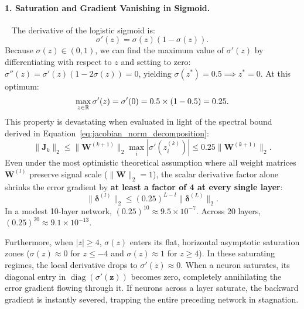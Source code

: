 \paragraph{1. Saturation and Gradient Vanishing in Sigmoid.}~\cite{glorot2010understanding}
The derivative of the logistic sigmoid is:
\begin{equation}
\sigma'(z) = \sigma(z)(1 - \sigma(z)).
\label{eq:sigmoid_derivative}
\end{equation}
Because $\sigma(z) \in (0, 1)$, we can find the maximum value of $\sigma'(z)$ by differentiating with respect to $z$ and setting to zero: $\sigma''(z) = \sigma'(z)(1 - 2\sigma(z)) = 0$, yielding $\sigma(z^*) = 0.5 \implies z^* = 0$. At this optimum:
\begin{equation}
\max_{z \in \mathbb{R}} \sigma'(z) = \sigma'(0) = 0.5 \times (1 - 0.5) = 0.25.
\label{eq:sigmoid_max_deriv}
\end{equation}
This property is devastating when evaluated in light of the spectral bound derived in Equation~\eqref{eq:jacobian_norm_decomposition}:
\begin{equation}
\|\mathbf{J}_k\|_2 \le \|\mathbf{W}^{(k+1)}\|_2 \max_i |\sigma'(z_i^{(k)})| \le 0.25 \|\mathbf{W}^{(k+1)}\|_2.
\end{equation}
Even under the most optimistic theoretical assumption where all weight matrices $\mathbf{W}^{(l)}$ preserve signal scale ($\|\mathbf{W}\|_2 = 1$), the scalar derivative factor alone shrinks the error gradient by \textbf{at least a factor of 4 at every single layer}:
\begin{equation}
\|\boldsymbol{\delta}^{(l)}\|_2 \le (0.25)^{L-l} \|\boldsymbol{\delta}^{(L)}\|_2.
\end{equation}
In a modest 10-layer network, $(0.25)^{10} \approx 9.5 \times 10^{-7}$. Across 20 layers, $(0.25)^{20} \approx 9.1 \times 10^{-13}$.

Furthermore, when $|z| \ge 4$, $\sigma(z)$ enters its flat, horizontal asymptotic saturation zones ($\sigma(z) \approx 0$ for $z \le -4$ and $\sigma(z) \approx 1$ for $z \ge 4$). In these saturating regimes, the local derivative drops to $\sigma'(z) \approx 0$. When a neuron saturates, its diagonal entry in $\operatorname{diag}(\sigma'(\mathbf{z}))$ becomes zero, completely annihilating the error gradient flowing through it. If neurons across a layer saturate, the backward gradient is instantly severed, trapping the entire preceding network in stagnation.

